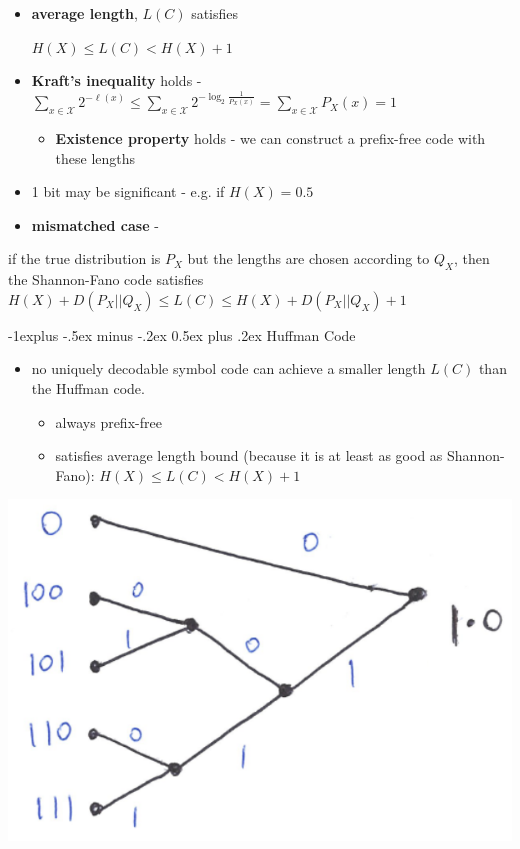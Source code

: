 \documentclass[10pt, landscape]{article}
\makeatletter
\renewcommand{\subsection}{\@startsection{subsection}{2}{0mm}%
  {-1explus -.5ex minus -.2ex}%
  {0.5ex plus .2ex}%
{\normalfont\normalsize\bfseries}}
\makeatother
\begin{document}
\begin{multicols*}{4}
  \begin{itemize}
    \item \textbf{average length}, $L(C)$ satisfies
      \begin{tightcenter}
        $H(X) \leq L(C) < H(X) + 1$
      \end{tightcenter}
    \item \textbf{Kraft's inequality} holds - 
      \( {\displaystyle{ \sum_{x \in \mathcal{X}} 2^{-\ell (x)} 
      \leq \sum_{x \in \mathcal{X}} 2^{-\log_2 \frac{1}{P_X(x)} } = \sum_{x \in \mathcal{X}} P_X(x) = 1 }} \) 
      \begin{itemize}
        \item \textbf{Existence property} holds - we can construct a prefix-free code with these lengths 
      \end{itemize}
    \item 1 bit may be significant - e.g. if $H(X)=0.5$
    \item \textbf{mismatched case} - 
  \end{itemize}
  \begin{tightcenter}
    if the true distribution is $P_X$ but the lengths are chosen according to $Q_X$, 
    then the Shannon-Fano code satisfies
    $H(X) + D(P_X \vert \vert Q_X) \leq L(C) \leq H(X) + D(P_X \vert \vert Q_X) + 1$
  \end{tightcenter}


  \subsection{Huffman Code}

  \begin{itemize}
    \item no uniquely decodable symbol code can achieve a smaller length $L(C)$ than the Huffman code.
      \begin{itemize}
        \item always prefix-free
        \item satisfies average length bound (because it is at least as good as Shannon-Fano):
          $H(X) \leq L(C) < H(X) + 1$
      \end{itemize}
  \end{itemize}

  \begin{tightcenter}
    \includegraphics[width=0.6\linewidth]{cd3236-huffman-code-tree.png} 
  \end{tightcenter}


\end{multicols*}
\end{document}
